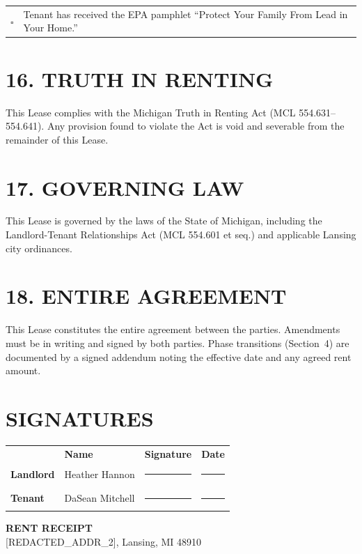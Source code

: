 \documentclass[11pt]{article}
\begin{document}
\medskip
\begin{tabular}{@{}p{0.5cm}p{12cm}@{}}
$\square$ & Tenant has received the EPA pamphlet ``Protect Your Family
From Lead in Your Home.'' \\
\end{tabular}

\section{16. TRUTH IN RENTING}

This Lease complies with the Michigan Truth in Renting Act
(MCL 554.631--554.641). Any provision found to violate the Act is void
and severable from the remainder of this Lease.

\section{17. GOVERNING LAW}

This Lease is governed by the laws of the State of Michigan, including
the Landlord-Tenant Relationships Act (MCL 554.601 et seq.) and
applicable Lansing city ordinances.

\section{18. ENTIRE AGREEMENT}

This Lease constitutes the entire agreement between the parties.
Amendments must be in writing and signed by both parties. Phase
transitions (Section~4) are documented by a signed addendum noting the
effective date and any agreed rent amount.

\bigskip
\section{SIGNATURES}

\bigskip

\begin{tabular}{@{}p{2.5cm}p{5cm}p{5cm}p{3cm}@{}}
 & \textbf{Name} & \textbf{Signature} & \textbf{Date} \\[1em]
\textbf{Landlord} & Heather Hannon & \rule{5cm}{0.4pt} & \rule{3cm}{0.4pt} \\[2em]
\textbf{Tenant} & DaSean Mitchell & \rule{5cm}{0.4pt} & \rule{3cm}{0.4pt} \\
\end{tabular}

\newpage

\begin{center}
{\Large \textbf{RENT RECEIPT}}\\[0.5em]
[REDACTED_ADDR_2], Lansing, MI 48910
\end{center}
\end{document}

